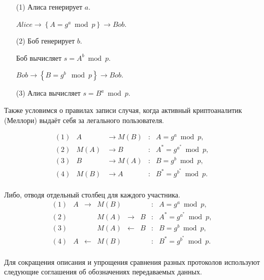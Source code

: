 \begin{enumerate}
	\item[(1)] Алиса генерирует $a$.
	\item[] $Alice \to \left\{ A = g^a \bmod p \right\} \to Bob$.
	\item[(2)] Боб генерирует $b$.
	\item[] Боб вычисляет $s = A^b \bmod p$.
	\item[] $Bob \to \left\{ B = g^b \mod p \right\} \to Bob$.
	\item[(3)] Алиса вычисляет $s = B^a \bmod p$.
\end{enumerate}

Также условимся о правилах записи случая, когда активный криптоаналитик (Меллори) выдаёт себя за легального пользователя.

\[
\begin{array}{llllc}
(1) & A                & \to M \left(B\right) & : & A   = g^a     \bmod p, \\ 
(2) & M \left(A\right) & \to B                & : & A^* = g^{a^*} \bmod p, \\ 
(3) & B                & \to M \left(A\right) & : & B   = g^b     \bmod p, \\ 
(4) & M \left(B\right) & \to A                & : & B^* = g^{b^*} \bmod p. \\
\end{array}
\]

Либо, отводя отдельный столбец для каждого участника.
\[
\begin{array}{lllclllc}
	(1) & A  & \to   & M \left(B\right) & {}    & {} & : & A = g^a     \bmod p, \\ 
	(2) & {} & {}    & M \left(A\right) & \to   & B  & : & A^* = g^{a^*} \bmod p, \\ 
	(3) & {} & {}    & M \left(A\right) & \gets & B  & : & B   = g^b     \bmod p, \\ 
	(4) & A  & \gets & M \left(B\right) & {}    & {} & : & B^* = g^{b^*} \bmod p. \\
\end{array}
\]

Для сокращения описания и упрощения сравнения разных протоколов используют следующие соглашения об обозначениях передаваемых данных.

